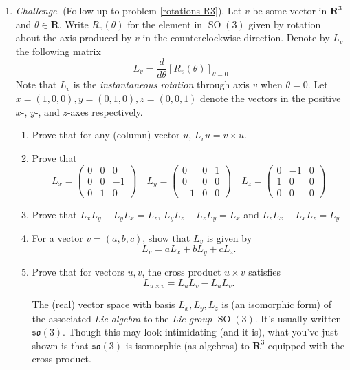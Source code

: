 \documentclass[12pt]{article}
\numberwithin{equation}{subsection}
\theoremstyle{note}
\newcommand{\SO}{\operatorname{SO}}
\begin{document}
\begin{enumerate}[label=\arabic*.]
	\item \textit{Challenge}. (Follow up to problem \ref{rotations-R3}). Let $v$ be some vector in $\mathbf{R}^3$ and $\theta\in \mathbf{R}$. Write  $R_v(\theta)$ for the element in $\SO(3)$ given by rotation about the axis produced by $v$ in the counterclockwise direction. Denote by $L_v$ the following matrix \[ L_v = \dfrac{d}{d\theta} \left[R_v(\theta) \right]_{\theta=0}\]
	Note that $L_v$ is the \textit{instantaneous rotation} through axis $v$ when $\theta=0$. 
	Let ${x}=(1,0,0), {y}=(0,1,0), {z}=(0,0,1)$ denote the vectors in the positive $x$-, $y$-, and $z$-axes respectively.
	\begin{enumerate}
	\item Prove that for any (column) vector $u$, $L_v u =v\times u$. 
	\item Prove that \[ L_x= \begin{pmatrix} 0 & 0 & 0 \\ 0 & 0 & -1 \\ 0 & 1 & 0\end{pmatrix} \quad L_y=\begin{pmatrix} 0 & 0 & 1 \\ 0 & 0 & 0 \\ -1 & 0 & 0 \end{pmatrix} \quad L_z=\begin{pmatrix} 0 & -1 & 0 \\ 1 & 0 & 0 \\ 0 & 0 & 0 \end{pmatrix}\]
	\item Prove that $L_x L_y-L_yL_x=L_z$, $L_yL_z-L_zL_y=L_x$ and $L_zL_x-L_xL_z=L_y$
	\item For a vector $v=(a,b,c)$, show that $L_v$ is given by  \[L_v=aL_x+bL_y+cL_z.\]
	\item Prove that for vectors $u,v$, the cross product $u\times v$ satisfies \[ L_{u\times v}=L_uL_v-L_uL_v.\]
	
	The (real) vector space with basis $L_x,L_y,L_z$ is (an isomorphic form) of the associated \textit{Lie algebra} to the \textit{Lie group} $\SO(3)$. It's usually written $\mathfrak{so}(3)$. Though this may look intimidating (and it is), what you've just shown is that $\mathfrak{so}(3)$ is isomorphic (as algebras) to $\mathbf{R}^3$ equipped with the cross-product.
	\end{enumerate}
	

\end{enumerate}
\end{document}
